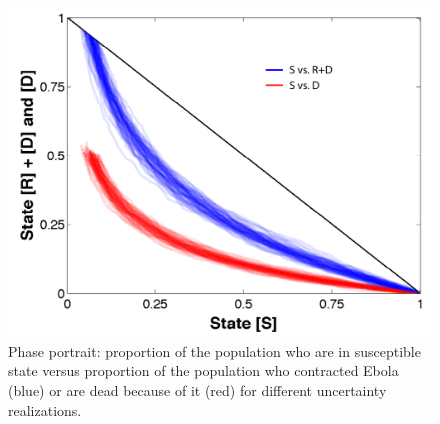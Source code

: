 %
\begin{figure}[h!]
\begin{center}
\includegraphics[scale=0.5]{PhasePortraitABM.pdf}
\end{center}
\caption{Phase portrait: proportion of the population who are in susceptible state versus proportion of the population who contracted Ebola (blue) or are dead because of it (red) for different uncertainty realizations.}
\label{fig:PhasePortraitAbm}
\end{figure}



